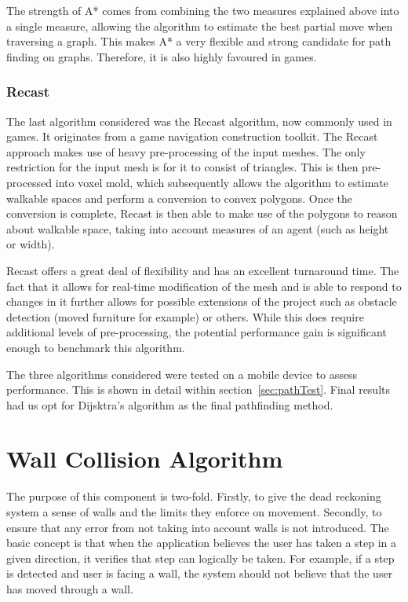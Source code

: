 \documentclass[12pt,a4paper]{report}
\begin{document}
The strength of A* comes from combining the two measures explained above into a single measure, allowing the algorithm to estimate the best partial move when traversing a graph. This makes A* a very flexible and strong candidate for path finding on graphs. Therefore, it is also highly favoured in games.

\subsubsection{Recast}
The last algorithm considered was the Recast\cite{libRecast} algorithm, now commonly used in games. It originates from a game navigation construction toolkit. The Recast approach makes use of heavy pre-processing of the input meshes. The only restriction for the input mesh is for it to consist of triangles. This is then pre-processed into voxel mold, which subsequently allows the algorithm to estimate walkable spaces and perform a conversion to convex polygons. Once the conversion is complete, Recast is then able to make use of the polygons to reason about walkable space, taking into account measures of an agent (such as height or width).

Recast offers a great deal of flexibility and has an excellent turnaround time. The fact that it allows for real-time modification of the mesh and is able to respond to changes in it further allows for possible extensions of the project such as obstacle detection (moved furniture for example) or others. While this does require additional levels of pre-processing, the potential performance gain is significant enough to benchmark this algorithm.

The three algorithms considered were tested on a mobile device to assess performance. This is shown in detail within section~\ref{sec:pathTest}. Final results had us opt for Dijsktra's algorithm as the final pathfinding method.

\section{Wall Collision Algorithm}

The purpose of this component is two-fold. Firstly, to give the dead reckoning system a sense of walls and the limits they enforce on movement. Secondly, to ensure that any error from not taking into account walls is not introduced. The basic concept is that when the application believes the user has taken a step in a given direction, it verifies that step can logically be taken. For example, if a step is detected and user is facing a wall, the system should not believe that the user has moved through a wall.
\end{document}
